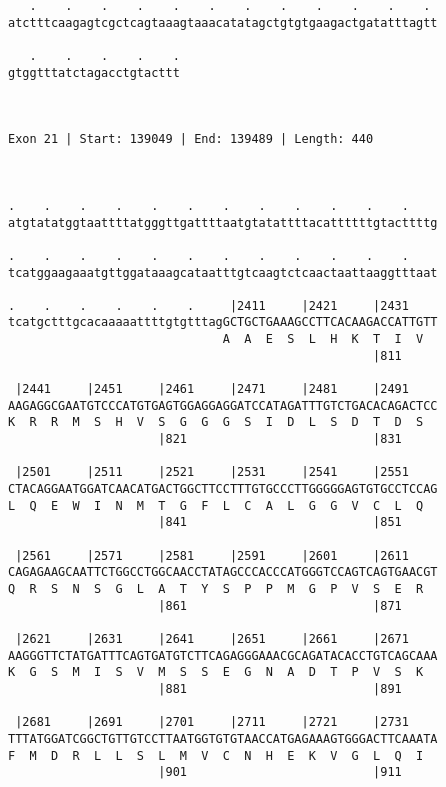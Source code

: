 \documentclass{article}
\begin{document}
\begin{Verbatim}
   .    .    .    .    .    .    .    .    .    .    .    . 
atctttcaagagtcgctcagtaaagtaaacatatagctgtgtgaagactgatatttagtt
                                                            
   .    .    .    .    .
gtggtttatctagacctgtacttt
                        
                        
 
Exon 21 | Start: 139049 | End: 139489 | Length: 440



.    .    .    .    .    .    .    .    .    .    .    .    
atgtatatggtaattttatgggttgattttaatgtatattttacattttttgtacttttg
                                                            
.    .    .    .    .    .    .    .    .    .    .    .    
tcatggaagaaatgttggataaagcataatttgtcaagtctcaactaattaaggtttaat
                                                            
.    .    .    .    .    .     |2411     |2421     |2431    
tcatgctttgcacaaaaattttgtgtttagGCTGCTGAAAGCCTTCACAAGACCATTGTT
                              A  A  E  S  L  H  K  T  I  V  
                                                   |811     
  
 |2441     |2451     |2461     |2471     |2481     |2491    
AAGAGGCGAATGTCCCATGTGAGTGGAGGAGGATCCATAGATTTGTCTGACACAGACTCC
K  R  R  M  S  H  V  S  G  G  G  S  I  D  L  S  D  T  D  S  
                     |821                          |831     
  
 |2501     |2511     |2521     |2531     |2541     |2551    
CTACAGGAATGGATCAACATGACTGGCTTCCTTTGTGCCCTTGGGGGAGTGTGCCTCCAG
L  Q  E  W  I  N  M  T  G  F  L  C  A  L  G  G  V  C  L  Q  
                     |841                          |851     
  
 |2561     |2571     |2581     |2591     |2601     |2611    
CAGAGAAGCAATTCTGGCCTGGCAACCTATAGCCCACCCATGGGTCCAGTCAGTGAACGT
Q  R  S  N  S  G  L  A  T  Y  S  P  P  M  G  P  V  S  E  R  
                     |861                          |871     
  
 |2621     |2631     |2641     |2651     |2661     |2671    
AAGGGTTCTATGATTTCAGTGATGTCTTCAGAGGGAAACGCAGATACACCTGTCAGCAAA
K  G  S  M  I  S  V  M  S  S  E  G  N  A  D  T  P  V  S  K  
                     |881                          |891     
  
 |2681     |2691     |2701     |2711     |2721     |2731    
TTTATGGATCGGCTGTTGTCCTTAATGGTGTGTAACCATGAGAAAGTGGGACTTCAAATA
F  M  D  R  L  L  S  L  M  V  C  N  H  E  K  V  G  L  Q  I  
                     |901                          |911     
  

\end{Verbatim}
\end{document}
